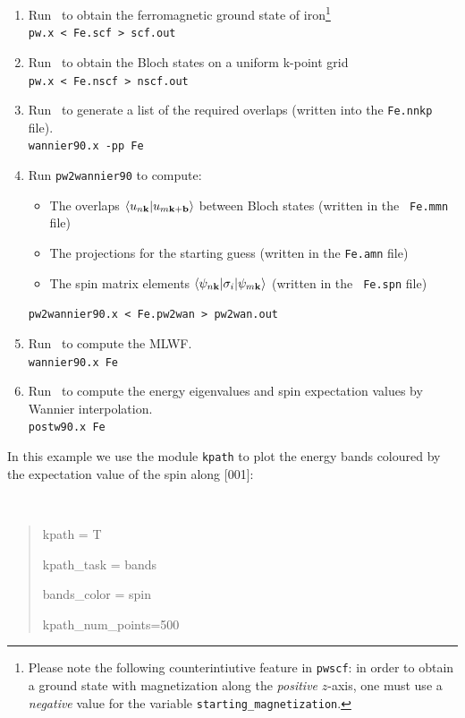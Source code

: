 \documentclass[a4paper,11pt,twoside]{article}
\begin{document}
\begin{enumerate}
\item Run \pwscf\ to obtain the ferromagnetic ground state of
  iron\footnote{Please note the following counterintiutive feature in
    {\tt pwscf}: in order to obtain a ground state with magnetization
    along the {\it positive} $z$-axis, one must use a {\it negative}
    value for the variable {\tt starting\_magnetization}.}\\
  {\tt pw.x < Fe.scf > scf.out}

\item Run \pwscf\ to obtain the Bloch states on a uniform k-point
  grid\\ 
{\tt pw.x < Fe.nscf > nscf.out}

\item Run \wannier\ to generate a list of the required overlaps (written
  into the {\tt Fe.nnkp} file).\\
{\tt wannier90.x -pp Fe}

\item Run {\tt pw2wannier90} to compute:
  \begin{itemize}
  \item{The overlaps $\langle u_{n{\bf k}}\vert u_{m{\bf k}+{\bf
          b}}\rangle$ between Bloch states (written in the {\tt
        Fe.mmn} file)}
    \item{The projections for the starting guess (written in the {\tt  Fe.amn} file)}
    \item{The spin matrix elements $\langle \psi_{n{\bf k}}\vert
        \sigma_i\vert \psi_{m{\bf k}}\rangle$ (written in the {\tt
          Fe.spn} file)}
  \end{itemize}
{\tt pw2wannier90.x < Fe.pw2wan > pw2wan.out}

\item Run \wannier\ to compute the MLWF.\\
{\tt wannier90.x Fe}

\item Run \postw\ to compute the energy eigenvalues and spin
  expectation values
  by Wannier interpolation.\\
  {\tt postw90.x Fe}

\end{enumerate}

 In this example we use the module {\tt kpath} to plot the energy
  bands coloured by the expectation value of the spin along [001]:
  {\tt
\begin{quote}
kpath = T

kpath\_task = bands

bands\_color = spin     

kpath\_num\_points=500
\end{quote} }
\end{document}
